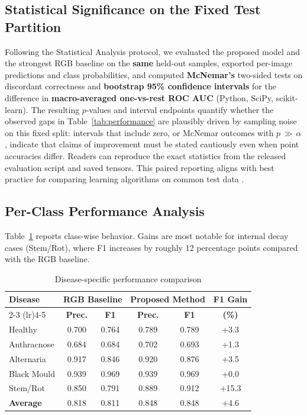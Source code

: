 \documentclass[conference]{IEEEtran}
\begin{document}
\subsection{Statistical Significance on the Fixed Test Partition}
Following the Statistical Analysis protocol, we evaluated the proposed model and the strongest RGB baseline on the \textbf{same} held-out samples, exported per-image predictions and class probabilities, and computed \textbf{McNemar's} two-sided tests on discordant correctness and \textbf{bootstrap 95\% confidence intervals} for the difference in \textbf{macro-averaged one-vs-rest ROC AUC} (Python, SciPy, scikit-learn). The resulting $p$-values and interval endpoints quantify whether the observed gaps in Table~\ref{tab:performance} are plausibly driven by sampling noise on this fixed split: intervals that include zero, or McNemar outcomes with $p\,{\gg}\,\alpha$, indicate that claims of improvement must be stated cautiously even when point accuracies differ. Readers can reproduce the exact statistics from the released evaluation script and saved tensors. This paired reporting aligns with best practice for comparing learning algorithms on common test data \cite{dietterich1998}.

\subsection{Per-Class Performance Analysis}
Table~\ref{tab:perclass} reports class-wise behavior. Gains are most notable for internal decay cases (Stem/Rot), where F1 increases by roughly 12 percentage points compared with the RGB baseline.

\begin{table}[!t]
    \caption{Disease-specific performance comparison}
    \label{tab:perclass}
    \raggedright
    \scriptsize
    \begin{tabular}{lccccc}
        \toprule
        \multirow{2}{*}{\textbf{Disease}} & \multicolumn{2}{c}{\textbf{RGB Baseline}} & \multicolumn{2}{c}{\textbf{Proposed Method}} & \textbf{F1 Gain} \\
        \cmidrule(lr){2-3} \cmidrule(lr){4-5}
         & \textbf{Prec.} & \textbf{F1} & \textbf{Prec.} & \textbf{F1} & \textbf{(\%)} \\
        \midrule
        Healthy & 0.700 & 0.764 & 0.789 & 0.789 & +3.3 \\
        Anthracnose & 0.684 & 0.684 & 0.702 & 0.693 & +1.3 \\
        Alternaria & 0.917 & 0.846 & 0.920 & 0.876 & +3.5 \\
        Black Mould & 0.939 & 0.969 & 0.939 & 0.969 & +0.0 \\
        Stem/Rot & 0.850 & 0.791 & 0.889 & 0.912 & +15.3 \\
        \midrule
        \textbf{Average} & 0.818 & 0.811 & 0.848 & 0.848 & +4.6 \\
        \bottomrule
    \end{tabular}
\end{table}
\end{document}
